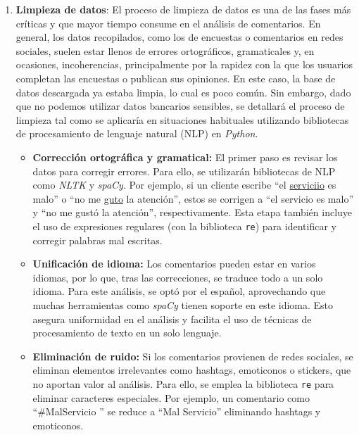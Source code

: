 \documentclass{matematicasud}
\begin{document}
\begin{enumerate}
    \item \textbf{Limpieza de datos}: El proceso de limpieza de datos es una de las fases más críticas y que mayor tiempo consume en el análisis de comentarios. En general, los datos recopilados, como los de encuestas o comentarios en redes sociales, suelen estar llenos de errores ortográficos, gramaticales y, en ocasiones, incoherencias, principalmente por la rapidez con la que los usuarios completan las encuestas o publican sus opiniones. En este caso, la base de datos descargada ya estaba limpia, lo cual es poco común. Sin embargo, dado que no podemos utilizar datos bancarios sensibles, se detallará el proceso de limpieza tal como se aplicaría en situaciones habituales utilizando bibliotecas de procesamiento de lenguaje natural (NLP) en \textit{Python}.
    
    \begin{itemize}
        \item \textbf{Corrección ortográfica y gramatical:} El primer paso es revisar los datos para corregir errores. Para ello, se utilizarán bibliotecas de NLP como \textit{NLTK} y \textit{spaCy}. Por ejemplo, si un cliente escribe ``el \underline{serviciio} es malo'' o ``no me \underline{guto} la atención'', estos se corrigen a ``el servicio es malo'' y ``no me gustó la atención'', respectivamente. Esta etapa también incluye el uso de expresiones regulares (con la biblioteca \texttt{re}) para identificar y corregir palabras mal escritas.
        
        \item \textbf{Unificación de idioma:} Los comentarios pueden estar en varios idiomas, por lo que, tras las correcciones, se traduce todo a un solo idioma. Para este análisis, se optó por el español, aprovechando que muchas herramientas como \textit{spaCy} tienen soporte en este idioma. Esto asegura uniformidad en el análisis y facilita el uso de técnicas de procesamiento de texto en un solo lenguaje.
        
        \item \textbf{Eliminación de ruido:} Si los comentarios provienen de redes sociales, se eliminan elementos irrelevantes como hashtags, emoticonos o stickers, que no aportan valor al análisis. Para ello, se emplea la biblioteca \texttt{re} para eliminar caracteres especiales. Por ejemplo, un comentario como ``\#MalServicio \faAngry[regular] '' se reduce a ``Mal Servicio'' eliminando hashtags y emoticonos.
        

\end{itemize}
\end{enumerate}
\end{document}
